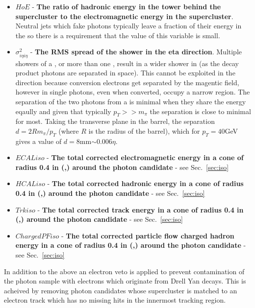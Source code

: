\begin{itemize}
  \item $HoE$ - \textbf{The ratio of hadronic energy in the \HCAL tower behind the supercluster to the electromagnetic energy in the supercluster}. Neutral jets which fake photons typically leave a fraction of their energy in the \HCAL so there is a requirement that the value of this variable is small.
  \item $\sigma^{2}_{i\eta i\eta}$ - \textbf{The RMS spread of the shower in the eta direction}. Multiple showers of a \pizero, or more than one \pizero, result in a wider shower in \eta (as the \pizero decay product photons are separated in space). This cannot be exploited in the \phi direction because conversion electrons get separated by the magentic field, however in \eta single photons, even when converted, occupy a narrow region. The separation of the two photons from a \pizero is minimal when they share the energy eqaully and given that typically $p_{T}>>m_{\pi}$ the separation is close to minimal for most. Taking the transverse plane in the barrel, the separation $d=2Rm_{\pi}/p_{T}$ (where $R$ is the radius of the barrel), which for $p_{T}=40$GeV gives a value of $d=$8mm$\sim0.006\eta$.
  \item $ECALiso$ - \textbf{The total \rho corrected electromagnetic energy in a cone of radius 0.4 in (\eta,\phi) around the photon candidate} - see Sec.~\ref{sec:iso}
  \item $HCALiso$ - \textbf{The total \rho corrected hadronic energy in a cone of radius 0.4 in (\eta,\phi) around the photon candidate} - see Sec.~\ref{sec:iso}
  \item $Trkiso$ - \textbf{The total \rho corrected track energy in a cone of radius 0.4 in (\eta,\phi) around the photon candidate} - see Sec.~\ref{sec:iso}
  \item $ChargedPFiso$ - \textbf{The total \rho corrected particle flow charged hadron energy in a cone of radius 0.4 in (\eta,\phi) around the photon candidate} - see Sec.~\ref{sec:iso}
\end{itemize}

In addition to the above an electron veto is applied to prevent contamination of the photon sample with electrons which originate from Drell Yan decays. This is acheived by removing photon candidates whose supercluster is matched to an electron track which has no missing hits in the innermost tracking region.

